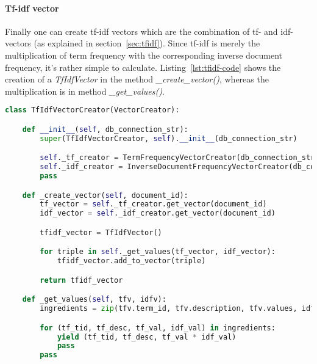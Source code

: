 \paragraph{Tf-idf vector}
Finally one can create tf-idf vectors which are the combination of tf- and idf-vectors (as explained in section~\ref{sec:tfidf}).
Since tf-idf is merely the multiplication of term frequency with the corresponding inverse document frequency, it's rather simple to calculate.
Listing~\ref{lst:tfidf-code} shows the creation of a \textit{TfIdfVector} in the method \textit{\_create\_vector()}, whereas the multiplication is in method \textit{\_get\_values()}.

\begin{lstlisting}[language=Python,caption={Python code for calculating tfidf-vectos on basis on tf- and idf-vectors},label={lst:tfidf-code},float=h]
class TfIdfVectorCreator(VectorCreator):

    def __init__(self, db_connection_str):
        super(TfIdfVectorCreator, self).__init__(db_connection_str)

        self._tf_creator = TermFrequencyVectorCreator(db_connection_str)
        self._idf_creator = InverseDocumentFrequencyVectorCreator(db_connection_str)
        pass

    def _create_vector(self, document_id):
        tf_vector = self._tf_creator.get_vector(document_id)
        idf_vector = self._idf_creator.get_vector(document_id)

        tfidf_vector = TfIdfVector()

        for triple in self._get_values(tf_vector, idf_vector):
            tfidf_vector.add_to_vector(triple)

        return tfidf_vector

    def _get_values(self, tfv, idfv):
        ingredients = zip(tfv.term_id, tfv.description, tfv.values, idfv.values)

        for (tf_tid, tf_desc, tf_val, idf_val) in ingredients:
            yield (tf_tid, tf_desc, tf_val * idf_val)
            pass
        pass
\end{lstlisting}

